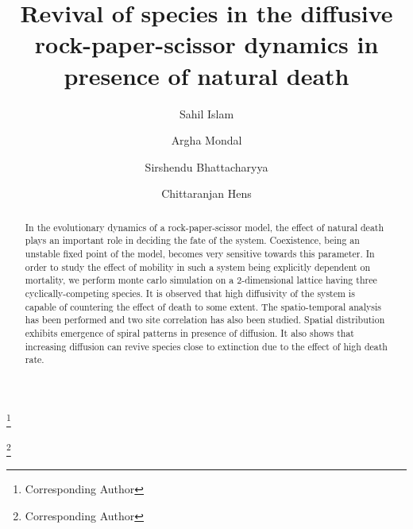 \documentclass[aps, pre, twocolumn, amsmath, superscriptaddress,showkeys,showpacs]{revtex4-1}
\begin{document}
	
    \title{{\color{blue}Revival of species in the diffusive rock-paper-scissor dynamics in presence of natural death}}
	\author{Sahil Islam} 
	
	
	
	
	\author{Argha Mondal}
	\author{Sirshendu Bhattacharyya} 
	\thanks{Corresponding Author}
	
	
	\author{Chittaranjan Hens}
	\thanks{Corresponding Author}
	
	
	
	\begin{abstract}
		\noindent
		{\color{red}In the evolutionary dynamics of a rock-paper-scissor model, the effect of natural death plays an important role in deciding the fate of the system. Coexistence, being an unstable fixed point of the model, becomes very sensitive towards this parameter. In order to study the effect of mobility in such a system being explicitly dependent on mortality, we perform monte carlo simulation on a $2$-dimensional lattice having three cyclically-competing species. It is observed that high diffusivity of the system is capable of countering the effect of death to some extent. The spatio-temporal analysis has been performed and two site correlation has also been studied. Spatial distribution exhibits emergence of spiral patterns in presence of diffusion. It also shows that increasing diffusion can revive species close to extinction due to the effect of high death rate.}
		
	\end{abstract}	
	
	\maketitle
	
\end{document}
